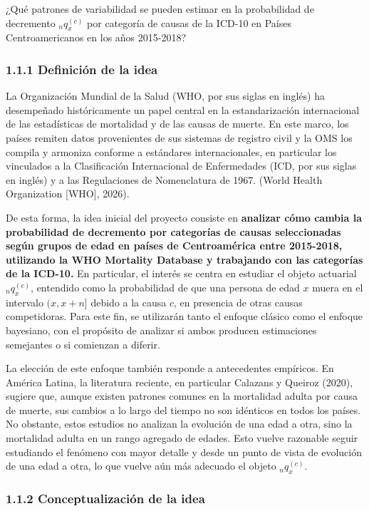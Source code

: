 \documentclass[
  letterpaper,
  DIV=11,
  numbers=noendperiod]{scrartcl}
\begin{document}
¿Qué patrones de variabilidad se pueden estimar en la probabilidad de
decremento \({}_{n}q_{x}^{(c)}\) por categoría de causas de la ICD-10 en
Países Centroamericanos en los años 2015-2018?

\subsubsection{1.1.1 Definición de la
idea}\label{definiciuxf3n-de-la-idea}

La Organización Mundial de la Salud (WHO, por sus siglas en inglés) ha
desempeñado históricamente un papel central en la estandarización
internacional de las estadísticas de mortalidad y de las causas de
muerte. En este marco, los países remiten datos provenientes de sus
sistemas de registro civil y la OMS los compila y armoniza conforme a
estándares internacionales, en particular los vinculados a la
Clasificación Internacional de Enfermedades (ICD, por sus siglas en
inglés) y a las Regulaciones de Nomenclatura de 1967. (World Health
Organization {[}WHO{]}, 2026).

De esta forma, la idea inicial del proyecto consiste en \textbf{analizar
cómo cambia la probabilidad de decremento por categorías de causas
seleccionadas según grupos de edad en países de Centroamérica entre
2015-2018, utilizando la WHO Mortality Database y trabajando con las
categorías de la ICD-10.} En particular, el interés se centra en
estudiar el objeto actuarial \({}_{n}q_{x}^{(c)}\), entendido como la
probabilidad de que una persona de edad \(x\) muera en el intervalo
\((x, x+n]\) debido a la causa \(c\), en presencia de otras causas
competidoras. Para este fin, se utilizarán tanto el enfoque clásico como
el enfoque bayesiano, con el propósito de analizar si ambos producen
estimaciones semejantes o si comienzan a diferir.

La elección de este enfoque también responde a antecedentes empíricos.
En América Latina, la literatura reciente, en particular Calazans y
Queiroz (2020), sugiere que, aunque existen patrones comunes en la
mortalidad adulta por causa de muerte, sus cambios a lo largo del tiempo
no son idénticos en todos los países. No obstante, estos estudios no
analizan la evolución de una edad a otra, sino la mortalidad adulta en
un rango agregado de edades. Esto vuelve razonable seguir estudiando el
fenómeno con mayor detalle y desde un punto de vista de evolución de una
edad a otra, lo que vuelve aún más adecuado el objeto
\({}_{n}q_{x}^{(c)}\).

\subsubsection{1.1.2 Conceptualización de la
idea}\label{conceptualizaciuxf3n-de-la-idea}
\end{document}
